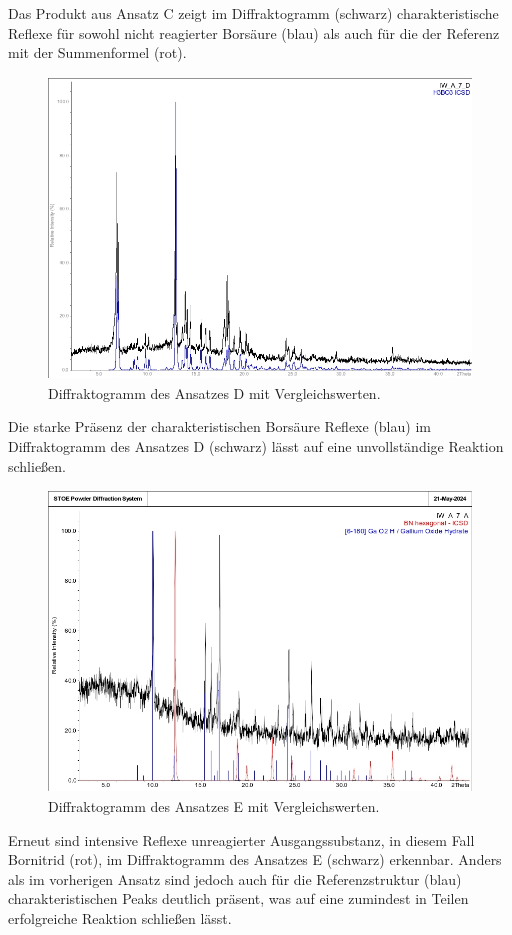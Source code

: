\documentclass[12pt]{article}
\begin{document}
\noindent Das Produkt aus Ansatz C zeigt im Diffraktogramm (schwarz) charakteristische Reflexe für sowohl nicht reagierter Borsäure  (blau) als auch für die der Referenz mit der Summenformel  (rot).

\begin{figure}[H]
    \centering
    \includegraphics[height=8cm]{Images/AutoklaveD.jpeg}
    \caption{Diffraktogramm des Ansatzes D mit Vergleichswerten.}
    \label{fig:6}
\end{figure}

\noindent Die starke Präsenz der charakteristischen Borsäure Reflexe (blau) im Diffraktogramm des Ansatzes D (schwarz) lässt auf eine unvollständige Reaktion schließen.

\begin{figure}[H]
    \centering
    \includegraphics[height=8cm]{Images/AutoklaveE.jpeg}
    \caption{Diffraktogramm des Ansatzes E mit Vergleichswerten.}
    \label{fig:7}
\end{figure}

\noindent Erneut sind intensive Reflexe unreagierter Ausgangssubstanz, in diesem Fall Bornitrid  (rot), im Diffraktogramm des Ansatzes E (schwarz) erkennbar. 
Anders als im vorherigen Ansatz sind jedoch auch für die Referenzstruktur  (blau) charakteristischen Peaks deutlich präsent, was auf eine zumindest in Teilen erfolgreiche Reaktion schließen lässt.



\end{document}
